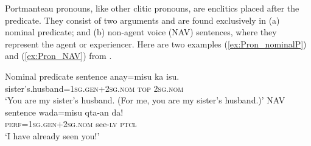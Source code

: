 Portmanteau pronouns, like other clitic pronouns, are enclitics placed after the predicate. They consist of two arguments and are found exclusively in (a) nominal predicate; and (b) non-agent voice (NAV) sentences, where they represent the agent or experiencer. Here are two examples (\ref{ex:Pron_nominalP}) and (\ref{ex:Pron_NAV}) from \textcite[74--75]{Lee2018Trugrammar}.

\begin{exe}

    \ex Nominal predicate sentence \label{ex:Pron_nominalP}
    \gll anay=misu ka isu. \\
    sister's.husband=\textsc{1sg.gen+2sg.nom} \textsc{top} \textsc{2sg.nom}\\
    \glt `You are my sister's husband. (For me, you are my sister's husband.)'
    \ex NAV sentence \label{ex:Pron_NAV}
    \gll wada=misu qta-an da! \\
    \textsc{perf}=\textsc{1sg.gen+2sg.nom} see-\textsc{lv} \textsc{ptcl}\\
    \glt `I have already seen you!'
\end{exe}




